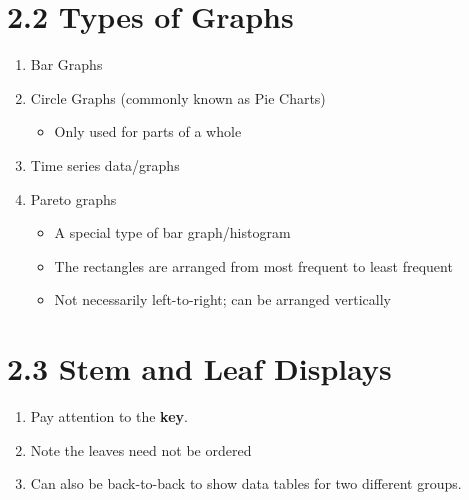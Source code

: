 \documentclass{article}
\begin{document}
\section*{2.2 Types of Graphs}

\begin{enumerate}

    \item Bar Graphs
    
    \item Circle Graphs (commonly known as Pie Charts)
    
        \begin{itemize}
        
            \item Only used for parts of a whole
            
        \end{itemize}
        
    \item Time series data/graphs
    
    \item Pareto graphs
    
        \begin{itemize}
        
            \item A special type of bar graph/histogram
            
            \item The rectangles are arranged from most frequent to least frequent
            
            \item Not necessarily left-to-right; can be arranged vertically
            
        \end{itemize}
        
\end{enumerate}

\section*{2.3 Stem and Leaf Displays}

\begin{enumerate}

    \item Pay attention to the {\bf key}.
    
    \item Note the leaves need not be ordered
    
    \item Can also be back-to-back to show data tables for two different groups.
    
\end{enumerate}
\end{document}
